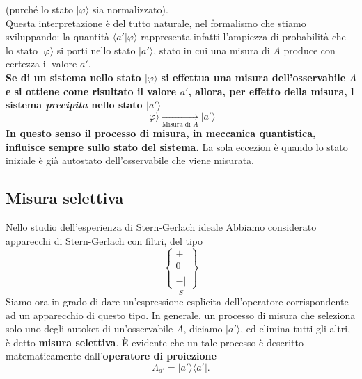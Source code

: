 \documentclass[a4paper,12pt,oneside]{book}
\begin{document}
(purché lo stato $\vert \varphi \rangle$ sia normalizzato).\\
Questa interpretazione è del tutto naturale, nel formalismo che stiamo sviluppando: la quantità $ \langle a' \vert \varphi \rangle$ rappresenta infatti l'ampiezza di probabilità che lo stato $\vert \varphi \rangle $ si porti nello stato $\vert a' \rangle $, stato in cui una misura di $A$ produce con certezza il valore $a'$.\\
\textbf{Se di un sistema nello stato $\vert \varphi \rangle $ si effettua una misura dell'osservabile $A$ e si ottiene come risultato il valore $a'$, allora, per effetto della misura, l sistema \textit{precipita} nello stato $ \vert a' \rangle $ }
\begin{equation}
\vert \varphi \rangle \xrightarrow[\textrm{Misura di }A]{ } \vert a' \rangle
\end{equation}
\textbf{In questo senso il processo di misura, in meccanica quantistica, influisce sempre sullo stato del sistema.} La sola eccezion è quando lo stato iniziale è già autostato dell'osservabile che viene misurata.
\subsection{Misura selettiva}
Nello studio dell'esperienza di Stern-Gerlach ideale Abbiamo considerato apparecchi di Stern-Gerlach con filtri, del tipo
\begin{equation}
\underset{S}{
\begin{Bmatrix}
+\ \\ 0\ | \\ -  |  
\end{Bmatrix}}
\end{equation}
Siamo ora in grado di dare un'espressione esplicita dell'operatore corrispondente ad un apparecchio di questo tipo. In generale, un processo di misura che seleziona solo uno degli autoket di un'osservabile $A$, diciamo $\vert a' \rangle $, ed elimina tutti gli altri, è detto \textbf{misura selettiva}. È evidente che un tale processo è descritto matematicamente dall'\textbf{operatore di proiezione}
\begin{equation}
\Lambda _{a'} = \vert a' \rangle \langle a'\vert.
\end{equation}
\end{document}
